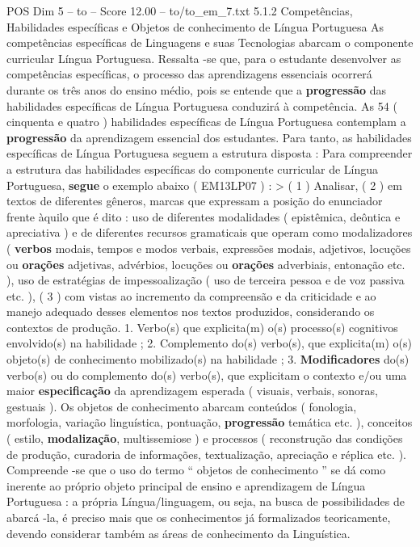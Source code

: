 \begin{textsample}{POS Dim 5 – to – Score 12.00 – to/to\_em\_7.txt}  \label{ex:f5_pos_025}
5.1.2 Competências, Habilidades específicas e Objetos de conhecimento de Língua Portuguesa As competências específicas de Linguagens e suas Tecnologias abarcam o componente curricular Língua Portuguesa.
Ressalta -se que, para o estudante desenvolver as competências específicas, o processo das aprendizagens essenciais ocorrerá durante os três anos do ensino médio, pois se entende que a \textbf{progressão} das habilidades específicas de Língua Portuguesa conduzirá à competência.
As 54 ( cinquenta e quatro ) habilidades específicas de Língua Portuguesa contemplam a \textbf{progressão} da aprendizagem essencial dos estudantes.
Para tanto, as habilidades específicas de Língua Portuguesa seguem a estrutura disposta : Para compreender a estrutura das habilidades específicas do componente curricular de Língua Portuguesa, \textbf{segue} o exemplo abaixo ( EM13LP07 ) : > ( 1 ) Analisar, ( 2 ) em textos de diferentes gêneros, marcas que expressam a posição do enunciador frente àquilo que é dito : uso de diferentes modalidades ( epistêmica, deôntica e apreciativa ) e de diferentes recursos gramaticais que operam como modalizadores ( \textbf{verbos} modais, tempos e modos verbais, expressões modais, adjetivos, locuções ou \textbf{orações} adjetivas, advérbios, locuções ou \textbf{orações} adverbiais, entonação etc. ), uso de estratégias de impessoalização ( uso de terceira pessoa e de voz passiva etc. ), ( 3 ) com vistas ao incremento da compreensão e da criticidade e ao manejo adequado desses elementos nos textos produzidos, considerando os contextos de produção. 1.
Verbo(s) que explicita(m) o(s) processo(s) cognitivos envolvido(s) na habilidade ; 2.
Complemento do(s) verbo(s), que explicita(m) o(s) objeto(s) de conhecimento mobilizado(s) na habilidade ; 3. \textbf{Modificadores} do(s) verbo(s) ou do complemento do(s) verbo(s), que explicitam o contexto e/ou uma maior \textbf{especificação} da aprendizagem esperada ( visuais, verbais, sonoras, gestuais ).
Os objetos de conhecimento abarcam conteúdos ( fonologia, morfologia, variação linguística, pontuação, \textbf{progressão} temática etc. ), conceitos ( estilo, \textbf{modalização}, multissemiose ) e processos ( reconstrução das condições de produção, curadoria de informações, textualização, apreciação e réplica etc. ).
Compreende -se que o uso do termo “ objetos de conhecimento ” se dá como inerente ao próprio objeto principal de ensino e aprendizagem de Língua Portuguesa : a própria Língua/linguagem, ou seja, na busca de possibilidades de abarcá -la, é preciso mais que os conhecimentos já formalizados teoricamente, devendo considerar também as áreas de conhecimento da Linguística.

\end{textsample}

